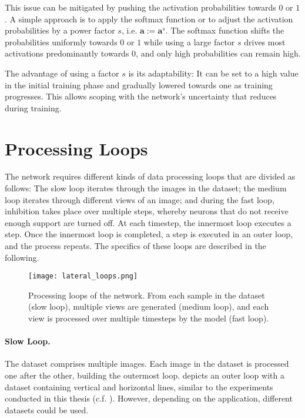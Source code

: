 This issue can be mitigated by pushing the activation probabilities towards $0$ or $1$. A simple approach is to apply the softmax function or to adjust the activation probabilities by a power factor $s$, i.e. $\boldsymbol{a} := \boldsymbol{a}^s$. The softmax function shifts the probabilities uniformly towards $0$ or $1$ while using a large factor $s$ drives most activations predominantly towards $0$, and only high probabilities can remain high.

The advantage of using a factor $s$ is its adaptability: It can be set to a high value in the initial training phase and gradually lowered towards one as training progresses. This allows scoping with the network's uncertainty that reduces during training.


\section{Processing Loops}
The network requires different kinds of data processing loops that are divided as follows:
The slow loop iterates through the images in the dataset; the medium loop iterates through different views of an image; and during the fast loop, inhibition takes place over multiple steps, whereby neurons that do not receive enough support are turned off.
At each timestep, the innermost loop executes a step. Once the innermost loop is completed, a step is executed in an outer loop, and the process repeats. The specifics of these loops are described in the following.

\begin{figure}[h]
    \centering
    \texttt{[image: lateral\_loops.png]}
    \caption[Processing loops of the network]{Processing loops of the network. From each sample in the dataset (slow loop), multiple views are generated (medium loop), and each view is processed over multiple timesteps by the model (fast loop).}
\end{figure}

\paragraph{Slow Loop.} The dataset comprises multiple images. Each image in the dataset is processed one after the other, building the outermost loop.  depicts an outer loop with a dataset containing vertical and horizontal lines, similar to the experiments conducted in this thesis (c.f. ). However, depending on the application, different datasets could be used.

